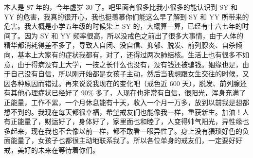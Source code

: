 \begin{case}
    本人是 87 年的，今年虚岁 30 了。吧里面有很多比我小很多的能认识到 SY 和 YY 的危害，我真的很开心，我也挺羡慕你们能这么早了解到 SY 和 YY 所带来的危害。我大概是小学五年级的时候染上 SY 的，大概算一算，已经有十六七年的时间了。因为 SY 和 YY 频率很高，所以没戒色之前出了很多大事情，由于人体的精华都消耗得差不多了，导致人自闭、没自信、抑郁、脱发、前列腺炎、自杀倾向，基本上大家有的症状我都有，对了，还得过两次肺结核。生活上也有很多不如意，由于得病没有上大学，一技之长什么也没有，没有钱还被骗钱。姻缘也是，由于自己没有自信，所以刚开始都是女孩子主动，然后当我想跟女生交往的时候，又因各种原因而错过。再来说说我现在的变化吧（戒色近 600 天），脱发、前列腺还有其他心理症状已经好了 90\% 多了，人现在也非常有自信，很阳光，浑身充满了正能量，工作不累，一个月休息能有十天，收入一个月一万多，放到以前我是想都想不到的。我现在每天都很幸福，希望戒友们也能像我一样，重获新生。加油！人有正能量了，财运好了，身体好了，家里面也和睦了，人变得帅气阳光，异性缘也多起来，现在我也不会像以前一样，都不敢看一眼异性了。身上没有猥琐好色的负面能量了，女孩子也都很主动地联系我了。所以各位单身的戒友们，一定要好好戒，美好的未来在等待着你们。

\end{case}
